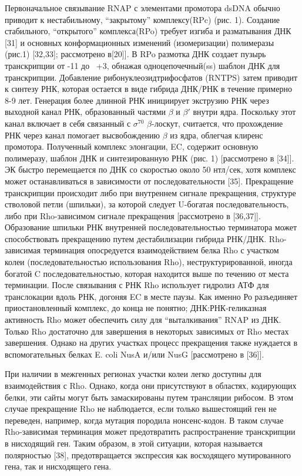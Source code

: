 \documentclass[a4paper,12pt]{article}
\begin{document}
    \par{Первоначальное связывание RNAP с элементами промотора dsDNA обычно приводит к нестабильному, “закрытому”
    комплексу(RPc) (рис. 1). Создание стабильного, “открытого” комплекса(RPo) требует изгиба и разматывания ДНК [31] и
    основных конформационных изменений (изомеризации) полимеразы (рис.1) [32,33]; рассмотрено в[20]]. В RPo размотка ДНК
    создает пузырь транскрипции от -11 до ~+3, обнажая одноцепочечный(ss) шаблон ДНК для транскрипции. Добавление
    рибонуклеозидтрифосфатов (RNTPS) затем приводит к синтезу РНК, которая остается в виде гибрида ДНК/РНК в течение
    примерно 8-9 лет. Генерация более длинной РНК инициирует экструзию РНК через выходной канал РНК, образованный частями
    \(\beta\) и \(\beta'\) внутри ядра. Поскольку этот канал включает в себя связанный с \(\sigma^{70}\)
    \(\beta\)-лоскут, считается, что прохождение РНК через канал помогает высвобождению \(\beta\) из ядра, облегчая
    клиренс промотора. Полученный комплекс элонгации, EC, содержит основную полимеразу, шаблон ДНК и синтезированную РНК
    (рис. 1) [рассмотрено в [34]]. ЭК быстро перемещается по ДНК со скоростью около 50 нтл/сек, хотя комплекс может
    останавливаться в зависимости от последовательности [35]. Прекращение транскрипции происходит либо при внутреннем
    сигнале прекращения, структуре стволовой петли (шпильки), за которой следует U-богатая последовательность, либо при
    Rho-зависимом сигнале прекращения [рассмотрено в [36,37]]. Образование шпильки РНК внутренней последовательностью
    терминатора может способствовать прекращению путем дестабилизации гибрида РНК/ДНК. Rho-зависимая терминация
    опосредуется взаимодействием белка Rho с участком колеи (последовательностью использования Rho), неструктурированной,
    иногда богатой C последовательностью, которая находится выше по течению от места терминации. После связывания с РНК
    Rho использует гидролиз АТФ для транслокации вдоль РНК, догоняя EC в месте паузы. Как именно Ро разъединяет
    приостановленный комплекс, до конца не понятно; ДНК:РНК-геликазная активность Rho может обеспечить силу для
    “выталкивания” RNAP из ДНК. Только Rho достаточно для завершения в некоторых зависимых от Rho местах завершения.
    Однако на других участках процесс прекращения также нуждается в вспомогательных белках E. coli NusA и/или NusG
    [рассмотрено в [36]].}
    \par{При наличии в межгенных регионах участки колеи легко доступны для взаимодействия с Rho. Однако, когда они
    присутствуют в областях, кодирующих белки, эти сайты могут быть замаскированы путем трансляции рибосом. В этом случае
    прекращение Rho не наблюдается, если только вышестоящий ген не переведен, например, когда мутация породила
    нонсенс-кодон. В таком случае Rho-зависимая терминация может предотвратить распространение транскрипции в нисходящий
    ген. Таким образом, в этой ситуации, которая называется полярностью [38], предотвращается экспрессия как восходящего
    мутированного гена, так и нисходящего гена.}
\end{document}

